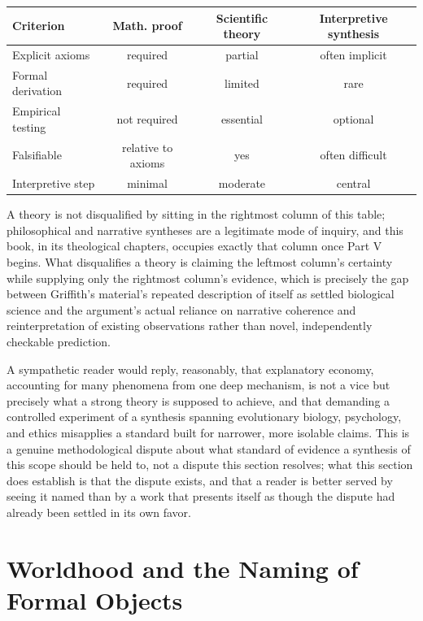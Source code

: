 \documentclass[11pt]{book}
\begin{document}
\begin{center}
\begin{tabular}{lccc}
\textbf{Criterion} & \textbf{Math. proof} & \textbf{Scientific theory} & \textbf{Interpretive synthesis} \\
\hline
Explicit axioms & required & partial & often implicit \\
Formal derivation & required & limited & rare \\
Empirical testing & not required & essential & optional \\
Falsifiable & relative to axioms & yes & often difficult \\
Interpretive step & minimal & moderate & central \\
\end{tabular}
\end{center}

A theory is not disqualified by sitting in the rightmost column of this table; philosophical and narrative syntheses are a legitimate mode of inquiry, and this book, in its theological chapters, occupies exactly that column once Part V begins. What disqualifies a theory is claiming the leftmost column's certainty while supplying only the rightmost column's evidence, which is precisely the gap between Griffith's material's repeated description of itself as settled biological science and the argument's actual reliance on narrative coherence and reinterpretation of existing observations rather than novel, independently checkable prediction.

A sympathetic reader would reply, reasonably, that explanatory economy, accounting for many phenomena from one deep mechanism, is not a vice but precisely what a strong theory is supposed to achieve, and that demanding a controlled experiment of a synthesis spanning evolutionary biology, psychology, and ethics misapplies a standard built for narrower, more isolable claims. This is a genuine methodological dispute about what standard of evidence a synthesis of this scope should be held to, not a dispute this section resolves; what this section does establish is that the dispute exists, and that a reader is better served by seeing it named than by a work that presents itself as though the dispute had already been settled in its own favor.

\section{Worldhood and the Naming of Formal Objects}
\end{document}
